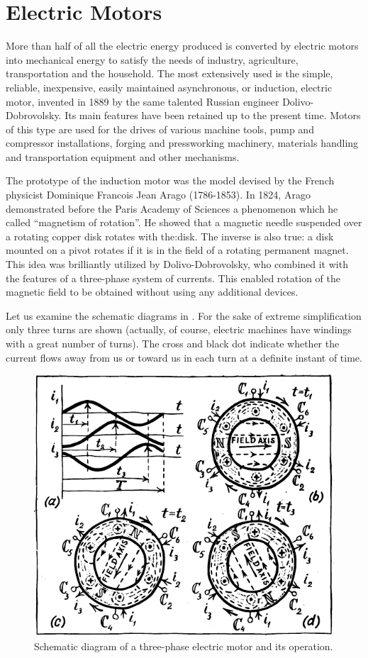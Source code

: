 \section{Electric Motors}

More than half of all the electric energy produced is converted by electric motors into mechanical energy to satisfy the needs of industry, agriculture, transportation and the household. The most extensively used is the simple, reliable, inexpensive, easily maintained asynchronous, or induction, electric motor, invented in 1889 by the same talented Russian engineer Dolivo-Dobrovolsky. Its main features have been retained up to the present time. Motors of this type are used for the drives of various machine tools, pump and compressor installations, forging and pressworking machinery, materials handling and transportation equipment and other mechanisms.

The prototype of the induction motor was the model devised by the French physicist Dominique Francois Jean Arago (1786-1853). In 1824, Arago demonstrated before the Paris Academy of Sciences a phenomenon which he called ``magnetism of rotation''. He showed that a magnetic needle suspended over a rotating copper disk rotates with the:disk. The inverse is also true: a disk mounted on a pivot rotates if it is in the field of a rotating permanent magnet. This idea was brilliantly utilized by Dolivo-Dobrovolsky, who combined it with the features of a three-phase system of currents. This enabled rotation of the magnetic field to be obtained without using any additional devices.

Let us examine the schematic diagrams in . For the sake of extreme simplification only three turns are shown (actually, of course, electric machines have windings with a great number of turns). The cross and black dot indicate whether the current flows away from us or toward us in each turn at a definite instant of time.
\begin{figure}[!ht]
\centering
\includegraphics[width=\textwidth]{figures/fig-04-08.pdf}
\caption{Schematic diagram of a three-phase electric motor and its operation.}
\label{fig-4.8}
\end{figure}

